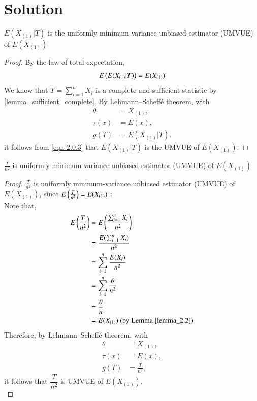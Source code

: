 \documentclass[journal,12pt,twocolumn]{IEEEtran}
\begin{document}
\section{Solution}
\begin{proposition} \label{prop_3.1}
$E(X_{(1)}|T)$ is the uniformly minimum-variance unbiased estimator (UMVUE) of $E(X_{(1)})$
\end{proposition}
\begin{proof}
By the law of total expectation, 
\begin{align}
\label{eqn 2.0.3}
E\left(E(X_{(1)} | T )\right) = E(X_{(1)})
\end{align}
We know that $T = \sum_{i=1}^n X_i$ is a complete and sufficient statistic by \ref{lemma_sufficient_complete}. By Lehmann–Scheffé theorem, with
\begin{align}
\theta &= X_{(1)},\\ 
\tau(x) &= E(x),\\
g(T) &= E(X_{(1)} | T).
\end{align}
it follows from \eqref{eqn 2.0.3} that $E(X_{(1)} | T)$ is the UMVUE of $E(X_{(1)})$.
\end{proof}
\begin{proposition} \label{prop_3.2}
$\frac{T}{n^2}$ is uniformly minimum-variance unbiased estimator (UMVUE) of $E(X_{(1)})$
\end{proposition}
\begin{proof}
$\frac{T}{n^2}$ is uniformly minimum-variance unbiased estimator (UMVUE) of $E(X_{(1)})$, since $E\left(\frac{T}{n^2}\right) = E(X_{(1)})$ : \\
Note that,
\begin{align}
E\left(\frac{T}{n^2}\right) &= E\left(\frac{\sum_{i=1}^n X_i}{n^2}\right)\\
&= \frac{E(\sum_{i=1}^n X_i)}{n^2}\\
&= \sum_{i=1}^n \frac{E(X_i)}{n^2}\\
&= \sum_{i=1}^n \frac{\theta}{n^2}\\
&= \frac{\theta}{n}\\
&= E(X_{(1)}) \text{ (by Lemma \ref{lemma_2.2})}
\end{align}
Therefore, by Lehmann–Scheffé theorem, with
\begin{align}
\theta &= X_{(1)},\\
\tau(x) &= E(x),\\
g(T) &= \frac{T}{n^2},
\end{align}
it follows that $\dfrac{T}{n^2}$ is UMVUE of $E(X_{(1)})$.\\
\end{proof}
\end{document}
